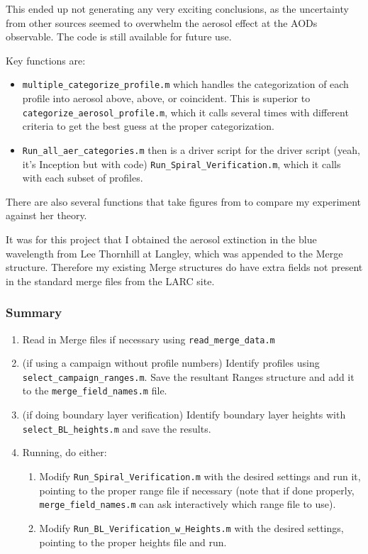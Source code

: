\documentclass[12pt]{article}
\begin{document}
		This ended up not generating any very exciting conclusions, as the uncertainty from other sources seemed to overwhelm the aerosol effect at the AODs observable. The code is still available for future use.
		
		Key functions are:
		\begin{itemize}
		\item \lstinline$multiple_categorize_profile.m$ which handles the categorization of each profile into aerosol above,  above, or coincident. This is superior to \lstinline$categorize_aerosol_profile.m$, which it calls several times with different criteria to get the best guess at the proper categorization.
		
		\item \lstinline$Run_all_aer_categories.m$ then is a driver script for the driver script (yeah, it's Inception but with code) \lstinline$Run_Spiral_Verification.m$, which it calls with each subset of profiles.
		\end{itemize}
		
		There are also several functions that take figures from \citet{leitao10} to compare my experiment against her theory.
		
		It was for this project that I obtained the aerosol extinction in the blue wavelength from Lee Thornhill at Langley, which was appended to the Merge structure. Therefore my existing Merge structures do have extra fields not present in the standard merge files from the LARC site.
		
		\subsubsection{Summary}		
		\begin{enumerate}
		\item Read in Merge files if necessary using \lstinline$read_merge_data.m$
		
		\item (if using a campaign without profile numbers) Identify profiles using \lstinline$select_campaign_ranges.m$. Save the resultant Ranges structure and add it to the \lstinline$merge_field_names.m$ file.
		
		\item (if doing boundary layer verification) Identify boundary layer heights with \lstinline$select_BL_heights.m$ and save the results.
		
		\item Running, do either:
			\begin{enumerate}
			\item Modify \lstinline$Run_Spiral_Verification.m$ with the desired settings and run it, pointing to the proper range file if necessary (note that if done properly, \lstinline$merge_field_names.m$ can ask interactively which range file to use).
			\item Modify \lstinline$Run_BL_Verification_w_Heights.m$ with the desired settings, pointing to the proper heights file and run.
			\end{enumerate}
		\end{enumerate}
	
\end{document}
